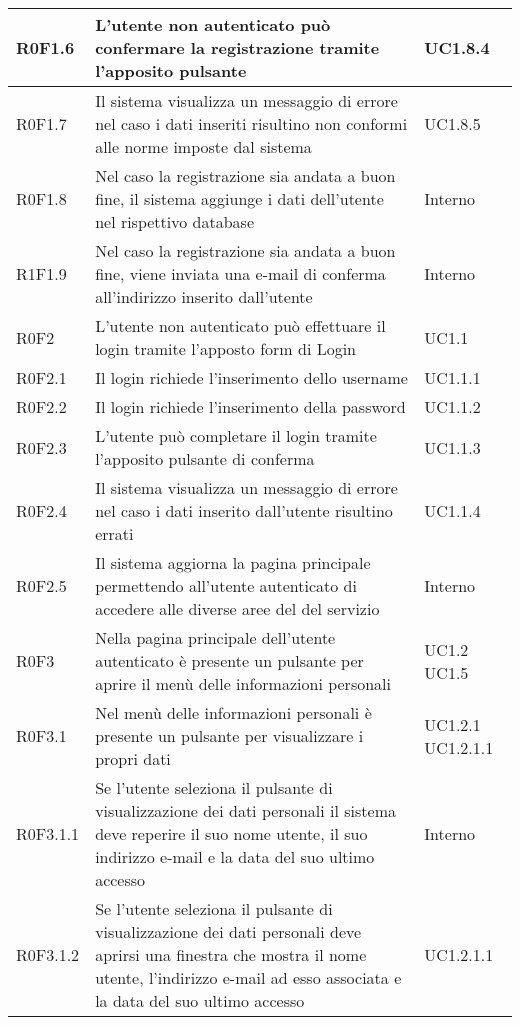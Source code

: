 \begin{center}
\begin{longtable}{| p{2cm} | p{8cm} | p{2cm} |}
		\hline
		R0F1.6  &  L'utente non autenticato può confermare la registrazione tramite l'apposito pulsante  &  UC1.8.4 \\
		\hline
		R0F1.7  &  Il sistema visualizza un messaggio di errore nel caso i dati inseriti risultino non conformi alle norme imposte dal sistema  &  UC1.8.5 \\
		\hline
		R0F1.8  &  Nel caso la registrazione sia andata a buon fine, il sistema aggiunge i dati dell'utente nel rispettivo database  &  Interno \\
		\hline
		R1F1.9  &  Nel caso la registrazione sia andata a buon fine, viene inviata una e-mail di conferma all'indirizzo inserito dall'utente  &  Interno \\
		\hline
		R0F2  &  L'utente non autenticato può effettuare il login tramite l'apposto form di Login  &  UC1.1 \\
		\hline
		R0F2.1  &  Il login richiede l'inserimento dello username  &  UC1.1.1 \\
		\hline
		R0F2.2  &  Il login richiede l'inserimento della password  &  UC1.1.2 \\
		\hline
		R0F2.3  &  L'utente può completare il login tramite l'apposito pulsante di conferma  &  UC1.1.3 \\
		\hline
		R0F2.4  &  Il sistema visualizza un messaggio di errore nel caso i dati inserito dall'utente risultino errati  &  UC1.1.4 \\
		\hline
		R0F2.5  &  Il sistema aggiorna la pagina principale permettendo all'utente autenticato di accedere alle diverse aree del del servizio  &  Interno  \\
		\hline
		R0F3  &  Nella pagina principale dell'utente autenticato è presente un pulsante per aprire il menù delle informazioni personali  &  UC1.2 \newline UC1.5 \\
		\hline
		R0F3.1  &  Nel menù delle informazioni personali è presente un pulsante per visualizzare i propri dati  &  UC1.2.1 \newline UC1.2.1.1 \\
		\hline
		R0F3.1.1  &  Se l'utente seleziona il pulsante di visualizzazione dei dati personali il sistema deve reperire il suo nome utente, il suo indirizzo e-mail e la data del suo ultimo accesso &  Interno \\
		\hline
		R0F3.1.2  &  Se l'utente seleziona il pulsante di visualizzazione dei dati personali deve aprirsi una finestra che mostra il nome utente, l'indirizzo e-mail ad esso associata e la data del suo ultimo accesso &  UC1.2.1.1 \\

\end{longtable}
\end{center}
